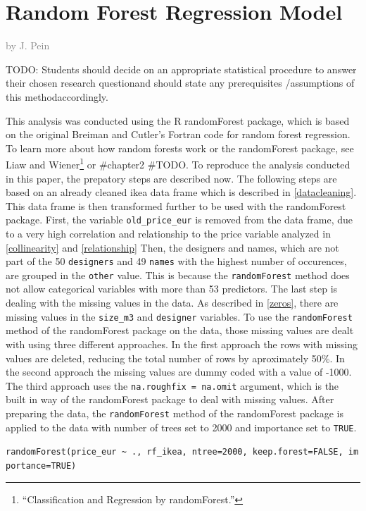 \documentclass[a4paper, nobind]{templates/ociamthesis}
\begin{document}
\hypertarget{rf}{%
\section{Random Forest Regression Model}\label{rf}}

\textcolor{gray}{by J. Pein}

TODO: Students should decide on an appropriate statistical procedure to answer their chosen research questionand should state any prerequisites /assumptions of this methodaccordingly.

This analysis was conducted using the R randomForest package, which is based on the original Breiman and Cutler's Fortran code for random forest regression. To learn more about how random forests work or the randomForest package, see Liaw and Wiener\footnote{``Classification and Regression by randomForest.''} or \#chapter2 \#TODO. To reproduce the analysis conducted in this paper, the prepatory steps are described now. The following steps are based on an already cleaned ikea data frame which is described in \ref{datacleaning}. This data frame is then transformed further to be used with the randomForest package.
First, the variable \texttt{old\_price\_eur} is removed from the data frame, due to a very high correlation and relationship to the price variable analyzed in \ref{collinearity} and \ref{relationship} Then, the designers and names, which are not part of the 50 \texttt{designers} and 49 \texttt{names} with the highest number of occurences, are grouped in the \texttt{other} value. This is because the \texttt{randomForest} method does not allow categorical variables with more than 53 predictors. The last step is dealing with the missing values in the data. As described in \ref{zeros}, there are missing values in the \texttt{size\_m3} and \texttt{designer} variables. To use the \texttt{randomForest} method of the randomForest package on the data, those missing values are dealt with using three different approaches. In the first approach the rows with missing values are deleted, reducing the total number of rows by aproximately 50\%. In the second approach the missing values are dummy coded with a value of -1000. The third approach uses the \texttt{na.roughfix\ =\ na.omit} argument, which is the built in way of the randomForest package to deal with missing values.
After preparing the data, the \texttt{randomForest} method of the randomForest package is applied to the data with number of trees set to 2000 and importance set to \texttt{TRUE}.

\texttt{randomForest(price\_eur\ \textasciitilde{}\ .,\ rf\_ikea,\ ntree=2000,\ keep.forest=FALSE,\ importance=TRUE)}
\end{document}
